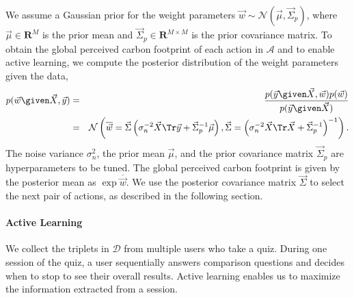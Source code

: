 We assume a Gaussian prior for the weight parameters $\vec{w} \sim \mathcal{N}(\vec{\mu}, \vec{\Sigma}_p)$, where $\vec{\mu} \in \mathbf{R}^M $ is the prior mean and $\vec{\Sigma}_p \in \mathbf{R}^{M \times M}$ is the prior covariance matrix.
To obtain the global perceived carbon footprint of each action in $\mathcal{A}$ and to enable active learning, we compute the posterior distribution of the weight parameters given the data,
\begin{eqnarray}
	\label{eq:posterior}
	p(\vec{w} \given \vec{X}, \vec{y})
	&=& \frac{p(\vec{y} \given \vec{X}, \vec{w})p(\vec{w})}{p(\vec{y} \given \vec{X})} \nonumber \\
	&=& \mathcal{N}\left(\overline{\vec{w}} = \vec{\Sigma} \left( \sigma_n^{-2} \vec{X}\Tr \vec{y} + \vec{\Sigma}_p^{-1} \vec{\mu}\right), \vec{\Sigma} = \left( \sigma_n^{-2} \vec{X}\Tr \vec{X} + \vec{\Sigma}_p^{-1} \right)^{-1}\right).
\end{eqnarray}
The noise variance $\sigma_n^2$, the prior mean $\vec{\mu}$, and the prior covariance matrix $\vec{\Sigma}_p$ are hyperparameters to be tuned.
The global perceived carbon footprint is given by the posterior mean as $\exp \overline{\vec{w}}$.
We use the posterior covariance matrix $\vec{\Sigma}$ to select the next pair of actions, as described in the following section.


\paragraph{Active Learning}
We collect the triplets in $\mathcal{D}$ from multiple users who take a quiz.
During one session of the quiz, a user sequentially answers comparison questions and decides when to stop to see their overall results.
Active learning enables us to maximize the information extracted from a session.

